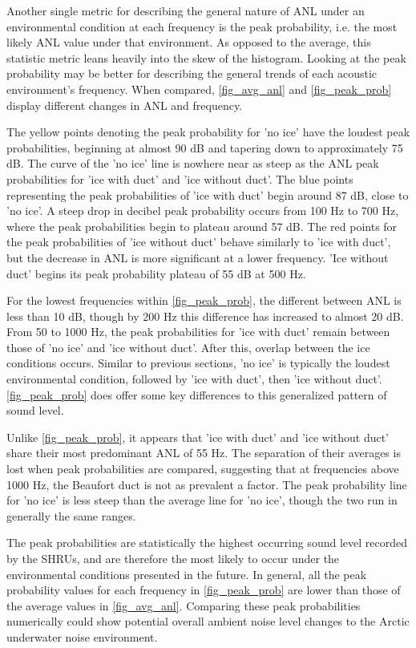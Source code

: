 Another single metric for describing the general nature of ANL under an environmental condition at each frequency is the peak probability, i.e. the most likely ANL value under that environment. As opposed to the average, this statistic metric leans heavily into the skew of the histogram. Looking at the peak probability may be better for describing the general trends of each acoustic environment's frequency. When compared, \autoref{fig_avg_anl} and \autoref{fig_peak_prob} display different changes in ANL and frequency. 

The yellow points denoting the peak probability for 'no ice' have the loudest peak probabilities, beginning at almost 90 dB and tapering down to approximately 75 dB. The curve of the 'no ice' line is nowhere near as steep as the ANL peak probabilities for 'ice with duct' and 'ice without duct'. The blue points representing the peak probabilities of 'ice with duct' begin around 87 dB, close to 'no ice'. A steep drop in decibel peak probability occurs from 100 Hz to 700 Hz, where the peak probabilities begin to plateau around 57 dB.  The red points for the peak probabilities of 'ice without duct' behave similarly to 'ice with duct', but the decrease in ANL is more significant at a lower frequency. 'Ice without duct' begins its peak probability plateau of 55 dB at 500 Hz.

For the lowest frequencies within \autoref{fig_peak_prob}, the different between ANL is less than 10 dB, though by 200 Hz this difference has increased to almost 20 dB. From 50 to 1000 Hz, the peak probabilities for 'ice with duct' remain between those of 'no ice' and 'ice without duct'. After this, overlap between the ice conditions occurs. Similar to previous sections, 'no ice' is typically the loudest environmental condition, followed by 'ice with duct', then 'ice without duct'. \autoref{fig_peak_prob} does offer some key differences to this generalized pattern of sound level.

Unlike \autoref{fig_peak_prob}, it appears that 'ice with duct' and 'ice without duct' share their most predominant ANL of 55 Hz. The separation of their averages is lost when peak probabilities are compared, suggesting that at frequencies above 1000 Hz, the Beaufort duct is not as prevalent a factor. The peak probability line for 'no ice' is less steep than the average line for 'no ice', though the two run in generally the same ranges. 

The peak probabilities are statistically the highest occurring sound level recorded by the SHRUs, and are therefore the most likely to occur under the environmental conditions presented in the future. In general, all the peak probability values for each frequency in \autoref{fig_peak_prob} are lower than those of the average values in \autoref{fig_avg_anl}. Comparing these peak probabilities numerically could show potential overall ambient noise level changes to the Arctic underwater noise environment.  


